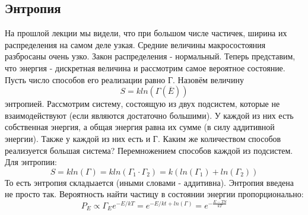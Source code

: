 \documentclass[a4paper, 12pt]{article}
\begin{document}
	\subsection{Энтропия}
	На прошлой лекции мы видели, что при большом числе частичек, ширина их распределения на самом деле узкая. Средние величины макросостояния разбросаны очень узко. Закон распределения - нормальный. Теперь представим, что энергия - дискретная величина и рассмотрим самое вероятное состояние. Пусть число способов его реализации равно Г. Назовём величину 
	\begin{equation*}
		S = k ln(\Gamma(\overline{E}))
	\end{equation*}
	энтропией. Рассмотрим систему, состоящую из двух подсистем, которые не взаимодействуют (если являются достаточно большими). У каждой из них есть собственная энергия, а общая энергия равна их сумме (в силу аддитивной энергии). Также у каждой из них есть и Г. Каким же количеством способов реализуется большая система? Перемножением способов каждой из подсистем. Для энтропии:
	\begin{equation*}
		S = kln(\Gamma) =  kln(\Gamma_{1} \cdot \Gamma_{2}) = k(ln(\Gamma_{1}) + ln(\Gamma_{2}))
	\end{equation*}
	То есть энтропия складыается (иными словами - аддитивна). Энтропия введена не просто так.  Вероятность найти частицу в состоянии энергии пропорционально:
	\begin{equation*}
		P_{E} \propto \Gamma_{E} e^{-E/kT} = e^{-E/kt + ln(\Gamma)} = e^{-\frac{E - TS}{kT}}
	\end{equation*}
\end{document}
